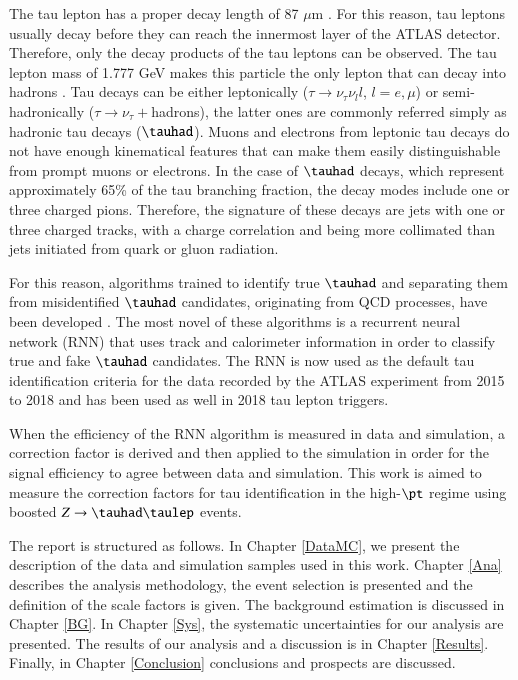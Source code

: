 The tau lepton has a proper decay length of 87 $\mu$m \cite{PhysRevD.98.030001}. For this reason, tau leptons usually decay before they can reach the innermost layer of the ATLAS detector. Therefore, only the decay products of the tau leptons can be observed. The tau lepton mass of 1.777 GeV makes this particle the only lepton that can decay into hadrons \cite{PhysRevD.98.030001}. Tau decays can be either leptonically ($\tau\to\nu_\tau\nu_l l$, $l=e,\mu$) or semi-hadronically ($\tau\to\nu_\tau+$hadrons), the latter ones are commonly referred simply as hadronic tau decays ($\tauhad$). Muons and electrons from leptonic tau decays do not have enough kinematical features that can make them easily distinguishable from prompt muons or electrons. In the case of $\tauhad$ decays, which represent approximately 65\% of the tau branching fraction, the decay modes include one or three charged pions. Therefore, the signature of these decays are jets with one or three charged tracks, with a charge correlation and being more collimated than jets initiated from quark or gluon radiation.

For this reason, algorithms trained to identify true $\tauhad$ and separating them from misidentified $\tauhad$  candidates, originating from QCD processes, have been developed \cite{Deutsch:2680523}. The most novel of these algorithms is a recurrent neural network (RNN) that uses track and calorimeter information in order to classify true and fake $\tauhad$ candidates. The RNN is now used as the default tau identification criteria for the data recorded by the ATLAS experiment from 2015 to 2018 and has been used as well in 2018 tau lepton triggers.

When the efficiency of the RNN algorithm is measured in data and simulation, a correction factor is derived and then applied to the simulation in order for the signal efficiency to agree between data and simulation. This work is aimed to measure the correction factors for tau identification in the high-$\pt$ regime using boosted $Z\to\tauhad\taulep$ events.

The report is structured as follows. In Chapter \ref{DataMC}, we present the description of the data and simulation samples used in this work. Chapter \ref{Ana}  describes the analysis methodology, the event selection is presented and the definition of the scale factors is given. The background estimation is discussed in Chapter \ref{BG}. In Chapter \ref{Sys}, the systematic uncertainties for our analysis are presented. The results of our analysis and a discussion is in Chapter \ref{Results}. Finally, in Chapter \ref{Conclusion} conclusions and prospects are discussed.
